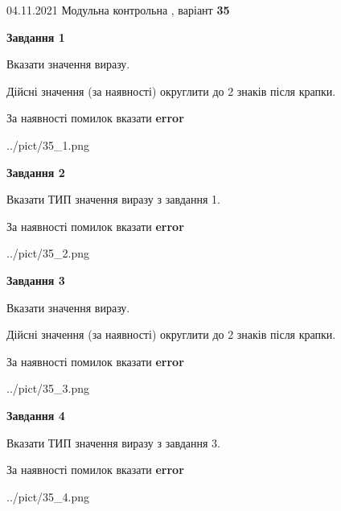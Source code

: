 \documentclass[11pt, ukrainian]{article}
\begin{document}
{04.11.2021 Модульна контрольна , варіант  \No \textbf { 35 }\par}
{
\begin {large}
{\begin {center}\textbf{Завдання 1}\end {center}}\par
Вказати значення виразу. \par
Дійсні значення (за наявності) округлити до 2 знаків після крапки. \par
За наявності помилок вказати \textbf{error}

\begin{center}
	{../pict/35_1.png}
\end{center}
\newpage

{\begin {center}\textbf{Завдання 2}\end {center}}\par
Вказати ТИП значення виразу з завдання 1. \par
За наявності помилок вказати \textbf{error}

\begin{center}
	{../pict/35_2.png}
\end{center}
\newpage

{\begin {center}\textbf{Завдання 3}\end {center}}\par
Вказати значення виразу. \par
Дійсні значення (за наявності) округлити до 2 знаків після крапки. \par
За наявності помилок вказати \textbf{error}

\begin{center}
	{../pict/35_3.png}
\end{center}
\newpage

{\begin {center}\textbf{Завдання 4}\end {center}}\par
Вказати ТИП значення виразу з завдання 3. \par
За наявності помилок вказати \textbf{error}

\begin{center}
	{../pict/35_4.png}
\end{center}
\newpage


\end{large}}
\end{document}
